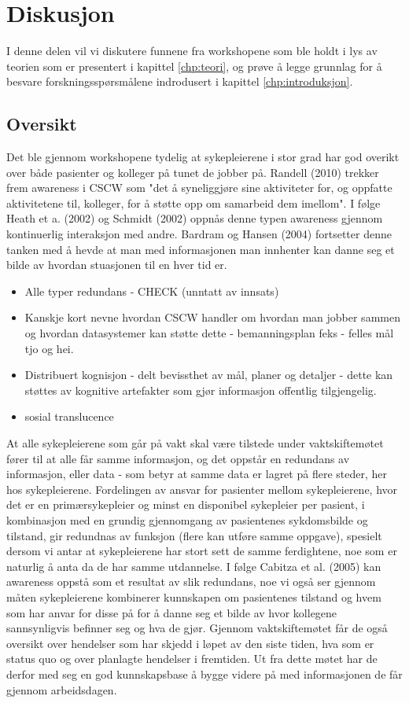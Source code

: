 \chapter{Diskusjon}
\label{chp:diskusjon}
I denne delen vil vi diskutere funnene fra workshopene som ble holdt i lys av teorien som er presentert i kapittel \ref{chp:teori}, og prøve å legge grunnlag for å besvare forskningsspørsmålene indrodusert i kapittel \ref{chp:introduksjon}.

\noindent
\section{Oversikt}
Det ble gjennom workshopene tydelig at sykepleierene i stor grad har god overikt over både pasienter og kolleger på tunet de jobber på. Randell (2010) trekker frem awareness i CSCW som "det å syneliggjøre sine aktiviteter for, og oppfatte aktivitetene til, kolleger, for å støtte opp om samarbeid dem imellom". I følge Heath et a. (2002) og Schmidt (2002) oppnås denne typen awareness gjennom kontinuerlig interaksjon med andre. Bardram og Hansen (2004) fortsetter denne tanken med å hevde at man med informasjonen man innhenter kan danne seg et bilde av hvordan stuasjonen til en hver tid er.

\noindent
\begin{itemize}
\item Alle typer redundans - CHECK (unntatt av innsats)
\item Kanskje kort nevne hvordan CSCW  handler om hvordan man jobber sammen og hvordan datasystemer kan støtte dette - bemanningsplan feks - felles mål tjo og hei.
\item Distribuert kognisjon - delt bevissthet av mål, planer og detaljer - dette kan støttes av kognitive artefakter som gjør informasjon offentlig tilgjengelig.
\item sosial translucence
\end{itemize}

\noindent
At alle sykepleierene som går på vakt skal være tilstede under vaktskiftemøtet fører til at alle får samme informasjon, og det oppstår en redundans av informasjon, eller data - som betyr at samme data er lagret på flere steder, her hos sykepleierene. Fordelingen av ansvar for pasienter mellom sykepleierene, hvor det er en primærsykepleier og minst en disponibel sykepleier per pasient, i kombinasjon med en grundig gjennomgang av pasientenes sykdomsbilde og tilstand, gir redundnas av funksjon (flere kan utføre samme oppgave), spesielt dersom vi antar at sykepleierene har stort sett de samme ferdightene, noe som er naturlig å anta da de har samme utdannelse. I følge Cabitza et al. (2005) kan awareness oppstå som et resultat av slik redundans, noe vi også ser gjennom måten sykepleierene kombinerer kunnskapen om pasientenes tilstand og hvem som har anvar for disse på for å danne seg et bilde av hvor kollegene sannsynligvis befinner seg og hva de gjør.
Gjennom vaktskiftemøtet får de også oversikt over hendelser som har skjedd i løpet av den siste tiden, hva som er status quo og over planlagte hendelser i fremtiden. Ut fra dette møtet har de derfor med seg en god kunnskapsbase å bygge videre på med informasjonen de får gjennom arbeidsdagen. 

